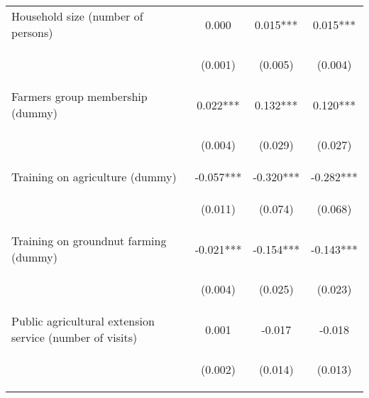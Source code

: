 \begin{center}
\begin{tabular}{lccc}
Household size (number of persons) & 0.000 & 0.015*** & 0.015*** \\
\vspace{4pt} & \begin{footnotesize}(0.001)\end{footnotesize} & \begin{footnotesize}(0.005)\end{footnotesize} & \begin{footnotesize}(0.004)\end{footnotesize} \\
Farmers group membership (dummy) & 0.022*** & 0.132*** & 0.120*** \\
\vspace{4pt} & \begin{footnotesize}(0.004)\end{footnotesize} & \begin{footnotesize}(0.029)\end{footnotesize} & \begin{footnotesize}(0.027)\end{footnotesize} \\
Training on agriculture (dummy) & -0.057*** & -0.320*** & -0.282*** \\
\vspace{4pt} & \begin{footnotesize}(0.011)\end{footnotesize} & \begin{footnotesize}(0.074)\end{footnotesize} & \begin{footnotesize}(0.068)\end{footnotesize} \\
Training on groundnut farming (dummy) & -0.021*** & -0.154*** & -0.143*** \\
\vspace{4pt} & \begin{footnotesize}(0.004)\end{footnotesize} & \begin{footnotesize}(0.025)\end{footnotesize} & \begin{footnotesize}(0.023)\end{footnotesize} \\
Public agricultural extension service (number of visits) & 0.001 & -0.017 & -0.018 \\
\vspace{4pt} & \begin{footnotesize}(0.002)\end{footnotesize} & \begin{footnotesize}(0.014)\end{footnotesize} & \begin{footnotesize}(0.013)\end{footnotesize} \\

\end{tabular}
\end{center}
